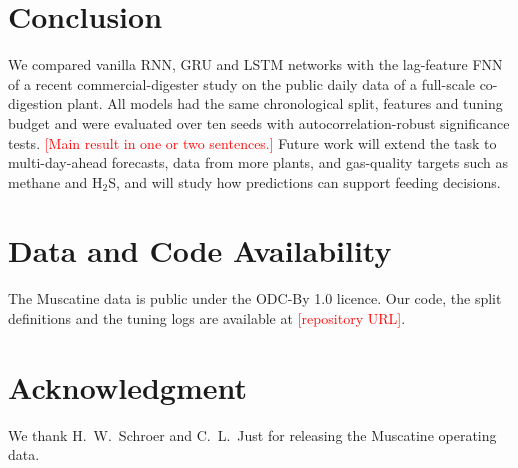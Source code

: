 \documentclass[conference]{IEEEtran}
\newcommand{\tbd}[1]{\textcolor{red}{[#1]}}
\begin{document}
\section{Conclusion}

We compared vanilla RNN, GRU and LSTM networks with the lag-feature FNN of a recent
commercial-digester study on the public daily data of a full-scale co-digestion plant. All
models had the same chronological split, features and tuning budget and were evaluated over
ten seeds with autocorrelation-robust significance tests. \tbd{Main result in one or two
sentences.} Future work will extend the task to multi-day-ahead forecasts, data from more
plants, and gas-quality targets such as methane and H$_2$S, and will study how predictions can
support feeding decisions.

\section*{Data and Code Availability}
The Muscatine data is public \cite{muscatinedata} under the ODC-By 1.0 licence. Our code, the
split definitions and the tuning logs are available at \tbd{repository URL}.

\section*{Acknowledgment}
We thank H.~W.~Schroer and C.~L.~Just for releasing the Muscatine operating data.



\end{document}
